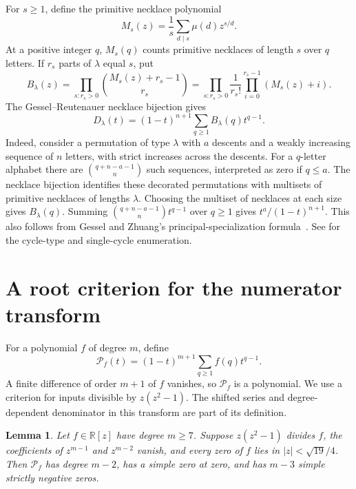 \documentclass[11pt]{article}
\newtheorem{lemma}[theorem]{Lemma}
\newcommand{\RR}{\mathbb R}
\newcommand{\PP}{\mathcal P}
\begin{document}
For $s\ge1$, define the primitive necklace polynomial
\[
M_s(z)=\frac1s\sum_{d\mid s}\mu(d)z^{s/d}.
\]
At a positive integer $q$, $M_s(q)$ counts primitive necklaces of
length $s$ over $q$ letters. If $r_s$ parts of $\lambda$ equal $s$, put
\[
B_\lambda(z)=\prod_{s:r_s>0}\binom{M_s(z)+r_s-1}{r_s}
 =\prod_{s:r_s>0}\frac1{r_s!}\prod_{i=0}^{r_s-1}(M_s(z)+i).
\]
The Gessel--Reutenauer necklace bijection gives
\begin{equation}\label{eq:gr}
D_\lambda(t)=(1-t)^{n+1}\sum_{q\ge1} B_\lambda(q)t^{q-1}.
\end{equation}
Indeed, consider a permutation of type $\lambda$ with $a$ descents and
a weakly increasing sequence of $n$ letters, with strict increases across
the descents. For a $q$-letter alphabet there are
$\binom{q+n-a-1}{n}$ such sequences, interpreted as zero if $q\le a$.
The necklace bijection identifies these decorated permutations with
multisets of primitive necklaces of lengths $\lambda$. Choosing the
multiset of necklaces at each size gives $B_\lambda(q)$. Summing
$\binom{q+n-a-1}{n}t^{q-1}$ over $q\ge1$ gives
$t^a/(1-t)^{n+1}$. This also follows from Gessel and Zhuang's
principal-specialization formula~\cite[Theorem 3.1(c)]{GZ}.
See \cite{GR,DMP,ET} for the cycle-type and single-cycle enumeration.

\section{A root criterion for the numerator transform}

For a polynomial $f$ of degree $m$, define
\[
\PP_f(t)=(1-t)^{m+1}\sum_{q\ge1}f(q)t^{q-1}.
\]
A finite difference of order $m+1$ of $f$ vanishes, so $\PP_f$ is a
polynomial. We use a criterion for inputs divisible by $z(z^2-1)$.
The shifted series and degree-dependent denominator in this transform
are part of its definition.

\begin{lemma}\label{lem:disc}
Let $f\in\RR[z]$ have degree $m\ge7$. Suppose $z(z^2-1)$ divides $f$,
the coefficients of $z^{m-1}$ and $z^{m-2}$ vanish, and every zero of
$f$ lies in $|z|<\sqrt{19}/4$. Then $\PP_f$ has degree $m-2$, has a
simple zero at zero, and has $m-3$ simple strictly negative zeros.
\end{lemma}
\end{document}
